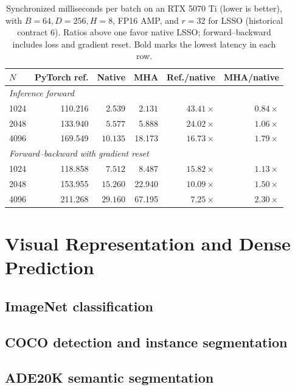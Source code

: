 \documentclass[10pt]{article}
\begin{document}
\begin{table}[H]
\centering
\footnotesize
\setlength{\tabcolsep}{4pt}
\caption{Synchronized milliseconds per batch on an RTX 5070 Ti (lower is
better), with $B=64,D=256,H=8$, FP16 AMP, and $r=32$ for LSSO
(historical contract 6).  Ratios above
one favor native LSSO; forward--backward includes loss and gradient reset.
Bold marks the lowest latency in each row.}
\label{tab:cuda-wall-clock}
\begin{tabular}{lrrrrr}
\toprule
$N$ & PyTorch ref. & Native & MHA & Ref./native & MHA/native \\
\midrule
\multicolumn{6}{l}{\emph{Inference forward}} \\
1024 & 110.216 & 2.539  & $\mathbf{2.131}$  & $43.41\times$ & $0.84\times$ \\
2048 & 133.940 & $\mathbf{5.577}$  & 5.888  & $24.02\times$ & $1.06\times$ \\
4096 & 169.549 & $\mathbf{10.135}$ & 18.173 & $16.73\times$ & $1.79\times$ \\
\midrule
\multicolumn{6}{l}{\emph{Forward--backward with gradient reset}} \\
1024 & 118.858 & $\mathbf{7.512}$  & 8.487  & $15.82\times$ & $1.13\times$ \\
2048 & 153.955 & $\mathbf{15.260}$ & 22.940 & $10.09\times$ & $1.50\times$ \\
4096 & 211.268 & $\mathbf{29.160}$ & 67.195 & $7.25\times$  & $2.30\times$ \\
\bottomrule
\end{tabular}
\end{table}

\section{Visual Representation and Dense Prediction}
\label{sec:vision}
\subsection{ImageNet classification}
\subsection{COCO detection and instance segmentation}
\subsection{ADE20K semantic segmentation}
\end{document}
